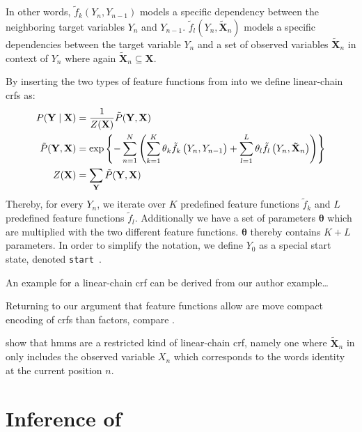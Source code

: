In other words, $\tilde{f}_k(Y_n,Y_{n-1})$ models a specific dependency between the neighboring \glspl{target variable} $Y_n$ and $Y_{n-1}$. $\tilde{f}_l(Y_n,\mathbf{\tilde{X}}_n)$ models a specific dependencies between the \gls{target variable} $Y_n$ and a set of \glspl{observed variable} $\mathbf{\tilde{X}}_n$ in context of $Y_n$ where again $\mathbf{\tilde{X}}_n\subseteq\mathbf{X}$.

By inserting the two types of \glspl{feature function} from  into  we define \glspl{linear-chain crf} as:
\begin{equation}
  \label{equ:linear-chain-crf-log-linear}
  \begin{split}
    P(\mathbf{Y}\mid\mathbf{X}) & = \frac{1}{Z(\mathbf{X})}\tilde{P}(\mathbf{Y},\mathbf{X})  \\
    \tilde{P}(\mathbf{Y},\mathbf{X}) & = \exp\left\{ -\sum_{n=1}^N \left(\sum_{k=1}^K\theta_k \tilde{f}_k\left(\vphantom{\tilde{X}}Y_n,Y_{n-1}\right)+\sum_{l=1}^L\theta_l \tilde{f}_l\left(Y_n,\mathbf{\tilde{X}}_n\right)\right) \right\} \\
    Z(\mathbf{X}) & = \sum_{\mathbf{Y}}\tilde{P}(\mathbf{Y},\mathbf{X})
  \end{split}
\end{equation}
Thereby, for every $Y_n$, we iterate over $K$ predefined \glspl{feature function} $\tilde{f}_k$ and $L$ predefined \glspl{feature function} $\tilde{f}_l$.
Additionally we have a set of parameters $\mathbf{\theta}$ which are multiplied with the two different feature functions.
$\mathbf{\theta}$ thereby contains $K+L$ parameters.
In order to simplify the notation, we define $Y_0$ as a special start state, denoted \texttt{start}~\citep{lafferty2001conditional}.

An example for a  \gls{linear-chain crf} can be derived from our author example\dots{}

Returning to our argument that \glspl{feature function} allow are move compact encoding of \glspl{crf} than \glspl{factor}, compare .

\citet{sutton2010introduction} show that \glspl{hmm} are a restricted kind of \gls{linear-chain crf}, namely one where $\mathbf{\tilde{X}}_n$ in  only includes the \gls{observed variable} $X_n$ which corresponds to the words identity at the current position $n$.

\section{Inference of }\label{sec:inference-crfs}

